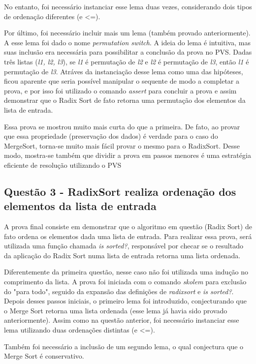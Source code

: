\documentclass[12pt]{article}
\begin{document}
No entanto, foi necessário instanciar esse lema duas vezes, considerando dois tipos de ordenação diferentes (\ll e <=).

Por último, foi necessário incluir mais um lema (também provado anteriormente). A esse lema foi dado o nome \textit{permutation switch}. A ideia do lema é intuitiva, mas suas inclusão era necessária para possibilitar a conclusão da prova no PVS. Dadas três listas (\textit{l1, l2, l3}), se \textit{l1} é permutação de \textit{l2} e \textit{l2} é permutação de \textit{l3}, então \textit{l1} é permutação de \textit{l3}. Atráves da instanciação desse lema como uma das hipóteses, ficou aparente que seria possível manipular o sequente de modo a completar a prova, e por isso foi utilizado o comando \textit{assert} para concluir a prova e assim demonstrar que o Radix Sort de fato retorna uma permutação dos elementos da lista de entrada.

Essa prova se mostrou muito mais curta do que a primeira. De fato, ao provar que essa propriedade (preservação dos dados) é verdade para o caso do MergeSort, torna-se muito mais fácil provar o mesmo para o RadixSort. Desse modo, mostra-se também que dividir a prova em passos menores é uma estratégia eficiente de resolução utilizando o PVS

\subsection{Questão 3 - RadixSort realiza ordenação dos elementos da lista de entrada}
A prova final consiste em demonstrar que o algoritmo em questão (Radix Sort) de fato ordena os elementos dada uma lista de entrada. Para realizar essa prova, será utilizada uma função chamada \textit{is sorted?}, responsável por checar se o resultado da aplicação do Radix Sort numa lista de entrada retorna uma lista ordenada.

Diferentemente da primeira questão, nesse caso não foi utilizada uma indução no comprimento da lista. A prova foi iniciada com o comando \textit{skolem} para exclusão do "para todo", seguido da expansão das definições de \textit{radixsort} e \textit{is sorted?}. Depois desses passos iniciais, o primeiro lema foi introduzido, conjecturando que o Merge Sort retorna uma lista ordenada (esse lema já havia sido provado anteriormente). Assim como na questão anterior, foi necessário instanciar esse lema utilizando duas ordenações distintas (\ll e <=).

Também foi necessário a inclusão de um segundo lema, o qual conjectura que o Merge Sort é conservativo.
\end{document}
